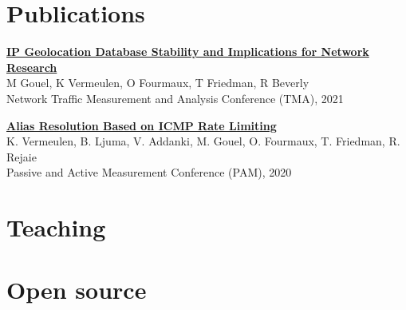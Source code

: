 \documentclass[11pt,a4paper,sans]{moderncv} %
\begin{document}

\section{Publications}

\href{https://dl.ifip.org/db/conf/tma/tma2021/tma2021-paper2.pdf}{\textbf{IP Geolocation Database Stability and Implications for Network Research}}\\
M Gouel, K Vermeulen, O Fourmaux, T Friedman, R Beverly\\
Network Traffic Measurement and Analysis Conference (TMA), 2021

\vspace{0.25cm}
\href{https://arxiv.org/pdf/2002.00252.pdf}{\textbf{Alias Resolution Based on ICMP Rate Limiting}} \\
K. Vermeulen, B. Ljuma, V. Addanki, M. Gouel, O. Fourmaux, T. Friedman, R. Rejaie\\
Passive and Active Measurement Conference (PAM), 2020


\section{Teaching}





\section{Open source}
\end{document}
